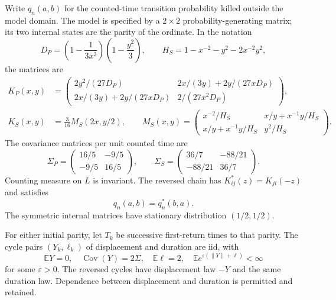 \documentclass[11pt,letterpaper]{article}
\numberwithin{equation}{section}
\theoremstyle{remark}\newtheorem{remark}[theorem]{Remark}
\newcommand{\EE}{\mathbb E}
\newcommand{\Cov}{\operatorname{Cov}}
\newcommand{\norm}[1]{\lVert#1\rVert}
\begin{document}
Write $q_n(a,b)$ for the counted-time transition probability killed outside the model domain. The model is specified by a $2\times2$ probability-generating matrix; its two internal states are the parity of the ordinate. In the notation
\begin{equation}
 D_P=\left(1-\frac1{3x^2}\right)\left(1-\frac{y^2}3\right),\qquad
 H_S=1-x^{-2}-y^2-2x^{-2}y^2,
\end{equation}
the matrices are
\begin{align}
 K_P(x,y)&=\begin{pmatrix}
 2y^2/(27D_P)&2x/(3y)+2y/(27xD_P)\\
 2x/(3y)+2y/(27xD_P)&2/(27x^2D_P)
 \end{pmatrix},\label{cps:amp:eq:PK}\\
 K_S(x,y)&=\frac3{16}M_S(2x,y/2),\qquad
 M_S(x,y)=\begin{pmatrix}
 x^{-2}/H_S&x/y+x^{-1}y/H_S\\
 x/y+x^{-1}y/H_S&y^2/H_S
 \end{pmatrix}.\label{cps:amp:eq:SK}
\end{align}
The covariance matrices per unit counted time are
\begin{equation}\label{cps:amp:eq:Sigma}
 \Sigma_P=\begin{pmatrix}16/5&-9/5\\-9/5&16/5\end{pmatrix},\qquad
 \Sigma_S=\begin{pmatrix}36/7&-88/21\\-88/21&36/7\end{pmatrix}.
\end{equation}
Counting measure on $L$ is invariant. The reversed chain has
$K^*_{ij}(z)=K_{ji}(-z)$ and satisfies
\begin{equation}\label{cps:amp:eq:reverse}
 q_n(a,b)=q_n^*(b,a).
\end{equation}
The symmetric internal matrices have stationary distribution $(1/2,1/2)$.

For either initial parity, let $T_k$ be successive first-return times to that parity. The cycle pairs $(Y_k,\ell_k)$ of displacement and duration are iid, with
\begin{equation}\label{cps:amp:eq:cycles}
 \EE Y=0,\quad\Cov(Y)=2\Sigma,\quad\EE\ell=2,
 \quad\EE e^{\varepsilon(\norm Y+\ell)}<\infty
\end{equation}
for some $\varepsilon>0$. The reversed cycles have displacement law $-Y$ and the same duration law. Dependence between displacement and duration is permitted and retained.
\end{document}
